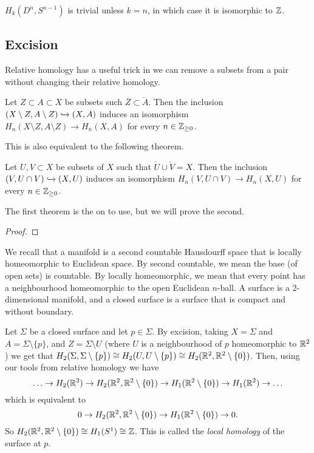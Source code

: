 \begin{example}
  $H_k(D^n, S^{n-1})$ is trivial unless $k = n$, in which case it is isomorphic to $\mathbb{Z}$. 
\end{example}

\subsection{Excision}

Relative homology has a useful trick in we can remove a subsets from a pair without changing their relative homology. 

\begin{theorem}
  Let $Z \subset A \subset X$ be subsets such $\overline Z \subset \mathring A$. Then the inclusion $(X \setminus Z, A \setminus Z) \xhookrightarrow{} (X,A)$ induces an isomorphism $H_n(X \setminus Z, A \setminus Z) \to H_n(X,A)$ for every $n \in \mathbb{Z}_{\geq 0}$.
\end{theorem}

This is also equivalent to the following theorem.

\begin{theorem}
  Let $U, V \subset X$ be subsets of $X$ such that $\mathring U \cup \mathring V = X$. Then the inclusion $(V, U \cap V) \xhookrightarrow{} (X,U)$ induces an isomorphism $H_n(V, U \cap V) \to H_n(X, U)$ for every $n \in \mathbb{Z}_{\geq 0}$. 
\end{theorem}

The first theorem is the on to use, but we will prove the second. 

\begin{proof}
\end{proof}

We recall that a manifold is a second countable Hausdourff space that is locally homeomorphic to Euclidean space. By second countable, we mean the base (of open sets) is countable. By locally homeomorphic, we mean that every point has a neighbourhood homeomorphic to the open Euclidean $n$-ball. A surface is a 2-dimensional manifold, and a closed surface is a surface that is compact and without boundary. 

\begin{example}
  Let $\Sigma$ be a closed surface  and let $p \in \Sigma$. By excision, taking $X = \Sigma$ and $A = \Sigma \setminus \{p\}$, and $Z = \Sigma \setminus U$ (where $U$ is a neighbourhood of $p$ homeomorphic to $\mathbb{R}^2$) we get that $H_2(\Sigma, \Sigma \setminus \{p\}) \cong H_2(U, U \setminus \{p\}) \cong H_2(\mathbb{R}^2, \mathbb{R}^2 \setminus \{0\})$. Then, using our tools from relative homology we have
  \[ \ldots \to H_2(\mathbb{R}^2) \to H_2(\mathbb{R}^2, \mathbb{R}^2 \setminus \{0\}) \to H_1(\mathbb{R}^2 \setminus \{0\}) \to H_1(\mathbb{R}^2) \to \ldots \] 
  which is equivalent to
  \[ 0 \to H_2(\mathbb{R}^2, \mathbb{R}^2 \setminus \{0\}) \to H_1(\mathbb{R}^2 \setminus \{0\}) \to 0. \]
  So $H_2(\mathbb{R}^2, \mathbb{R}^2 \setminus \{0\}) \cong H_1(S^1) \cong \mathbb{Z}$. This is called the \emph{local homology} of the surface at $p$. 
\end{example}